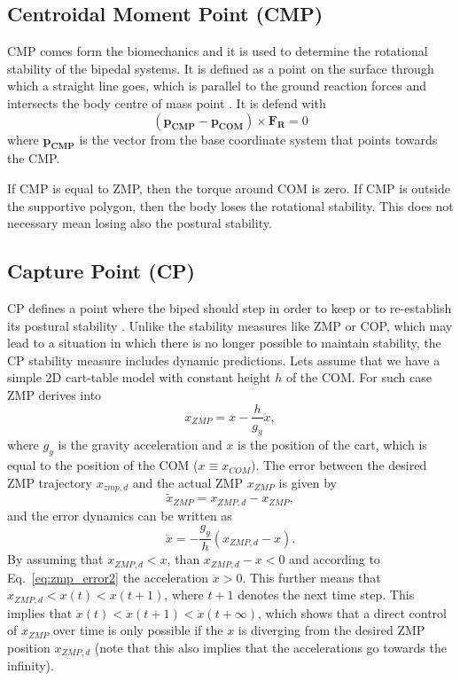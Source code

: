 \documentclass[12pt,a4paper,twoside]{article}
\begin{document}
\subsection{Centroidal Moment Point (CMP)}

CMP comes form the biomechanics and it is used to determine the rotational stability of the bipedal systems. It is defined as a point on the surface through which a straight line goes, which is parallel to the ground reaction forces and intersects the body centre of mass point \cite{Goswami2004,Popovic2005}. It is defend with
\begin{equation}
(\bm{p_{CMP}} - \bm{p_{COM}}) \times \bm{F_{R}} = 0
\label{e14}
\end{equation}
where $\bm{p_{CMP}}$ is the vector from the base coordinate system that points towards the CMP.

If CMP is equal to ZMP, then the torque around COM is zero. If CMP is outside the supportive polygon, then the body loses the rotational stability. This does not necessary mean losing also the postural stability. 


\subsection{{Capture Point (CP)}}

CP defines a point where the biped should step in order to keep or to re-establish its postural stability \cite{Pratt2006, Koolen2012}. Unlike the stability measures like ZMP or COP, which may lead to a situation in which there is no longer possible to maintain stability, the CP stability measure includes dynamic predictions. Lets assume that we have a simple 2D cart-table model with constant height $h$ of the COM. For such case ZMP derives into
\begin{equation}
x_{ZMP} = x - \frac{h}{g_y}\ddot{x}, 
\end{equation}  
where $g_y$ is the gravity acceleration and $x$ is the position of the cart, which is equal to the position of the COM ($x\equiv x_{COM}$). The error between the desired ZMP trajectory $x_{zmp,d}$ and the actual ZMP $x_{ZMP}$ is given by
\begin{equation}
\tilde{x}_{ZMP} = x_{ZMP,d} - x_{ZMP},
\end{equation}
and the error dynamics can be written as
\begin{equation}
\ddot{x} = - \frac{g_y}{h} (x_{ZMP,d} - x).
\label{eq:zmp_error2}
\end{equation}
By assuming that $x_{ZMP,d} < x$, than $x_{ZMP,d} - x < 0$ and according to Eq.~\ref{eq:zmp_error2} the acceleration $\ddot{x} > 0$. This further means that $x_{ZMP,d}  < x(t) < x(t+1)$, where $t+1$ denotes the next time step. This implies that $\ddot{x}(t) < \ddot{x}(t+1) < \ddot{x}(t+\infty)$, which shows that a direct control of $x_{ZMP}$ over time is only possible if the $x$ is diverging from the desired ZMP position $x_{ZMP,d}$ (note that this also implies that the accelerations go towards the infinity).
\end{document}
